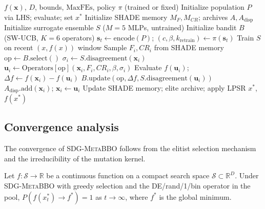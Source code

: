 \documentclass[preprint,12pt,number]{elsarticle}
\newcommand{\sdg}{\textsc{SDG-MetaBBO}}
\newcommand{\xbest}{x^*}
\begin{document}
\begin{algorithm}[t]
\caption{\sdg{}: Surrogate-Disagreement-Guided MetaBBO}
\label{alg:sdg}
\begin{algorithmic}[1]
\REQUIRE $f(\mathbf{x})$, $D$, bounds, $\text{MaxFEs}$, policy $\pi$ (trained or fixed)
\STATE Initialize population $P$ via LHS; evaluate; set $\xbest$
\STATE Initialize SHADE memory $M_F, M_{CR}$; archives $A, A_{\text{disp}}$
\STATE Initialize surrogate ensemble $S$ ($M{=}5$ MLPs, untrained)
\STATE Initialize bandit $B$ (SW-UCB, $K{=}6$ operators)
    \STATE $\mathbf{s}_t \gets \text{encode}(P)$; $(c, \beta, k_{\text{retrain}}) \gets \pi(\mathbf{s}_t)$
  \ENDIF
    \STATE Train $S$ on recent $(x, f(x))$ window
  \ENDIF
    \STATE Sample $F_i, CR_i$ from SHADE memory
    \STATE $\text{op} \gets B.\text{select}()$ \hfill {}
    \STATE $\sigma_i \gets S.\text{disagreement}(\mathbf{x}_i)$
    \STATE $\mathbf{u}_i \gets \text{Operators}[\text{op}](\mathbf{x}_i, F_i, CR_i, \beta, \sigma_i)$
    \STATE Evaluate $f(\mathbf{u}_i)$; $\Delta f \gets f(\mathbf{x}_i) - f(\mathbf{u}_i)$
    \STATE $B.\text{update}(\text{op}, \Delta f, S.\text{disagreement}(\mathbf{u}_i))$
      \STATE $A_{\text{disp}}.\text{add}(\mathbf{x}_i)$; $\mathbf{x}_i \gets \mathbf{u}_i$
    \ENDIF
  \ENDFOR
  \STATE Update SHADE memory; elite archive; apply LPSR
\ENDWHILE
\RETURN $\xbest$, $f(\xbest)$
\end{algorithmic}
\end{algorithm}

\subsection{Convergence analysis}
\label{sec:convergence}

The convergence of \sdg{} follows from the elitist selection mechanism and the irreducibility of the mutation kernel.

\begin{proposition}
Let $f: \mathcal{S} \to \mathbb{R}$ be a continuous function on a compact search space $\mathcal{S} \subset \mathbb{R}^D$. Under \sdg{} with greedy selection and the DE/rand/1/bin operator in the pool, $P(f(\xbest_t) \to f^*) = 1$ as $t \to \infty$, where $f^*$ is the global minimum.
\end{proposition}
\end{document}
